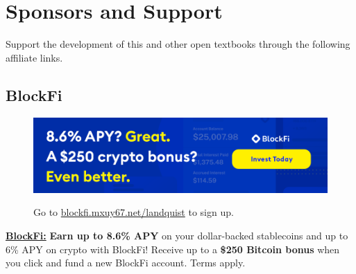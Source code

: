 \chapter*{Sponsors and Support}

Support the development of this and other open textbooks through the following affiliate links.

\section*{BlockFi}
\begin{figure}[!ht]
    \centering
    \href{https://blockfi.mxuy67.net/c/2612759/907789/10568}{\includegraphics[width=\textwidth]{img/support/blockFi/blockfi-banner0.png}}
    \caption{Go to \href{https://blockfi.mxuy67.net/c/2612759/907789/10568}{blockfi.mxuy67.net/landquist} to sign up.}
\end{figure}

\noindent \href{https://blockfi.mxuy67.net/c/2612759/907789/10568}{{\bf BlockFi:}} {\bf Earn up to 8.6\% APY} on your dollar-backed stablecoins and up to 6\% APY on crypto with BlockFi! Receive up to a {\bf \$250 Bitcoin bonus} when you click and fund a new BlockFi account. Terms apply.

